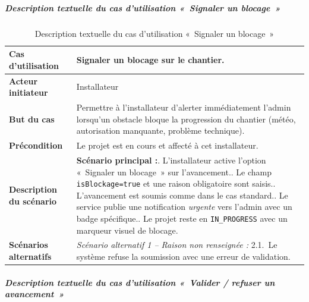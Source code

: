 \subparagraph{Description textuelle du cas d'utilisation «~Signaler un blocage~»}

\begin{table}[H]
  \caption{Description textuelle du cas d'utilisation «~Signaler un blocage~»}
  \label{tab:cu-blocage}
  \centering
  \begin{tabularx}{\textwidth}{|L{3.8cm}|X|}
    \hline
    \textbf{Cas d'utilisation} & Signaler un blocage sur le chantier. \\
    \hline
    \textbf{Acteur initiateur} & Installateur \\
    \hline
    \textbf{But du cas} & Permettre à l'installateur d'alerter immédiatement l'admin lorsqu'un obstacle bloque la progression du chantier (météo, autorisation manquante, problème technique). \\
    \hline
    \textbf{Précondition} & Le projet est en cours et affecté à cet installateur. \\
    \hline
    \textbf{Description du scénario} &
    \textbf{Scénario principal :}. L'installateur active l'option «~Signaler un blocage~» sur l'avancement.. Le champ \texttt{isBlockage=true} et une raison obligatoire sont saisis.. L'avancement est soumis comme dans le cas standard.. Le service publie une notification \textit{urgente} vers l'admin avec un badge spécifique.. Le projet reste en \texttt{IN\_PROGRESS} avec un marqueur visuel de blocage.\\
    \hline
    \textbf{Scénarios alternatifs} &
    \textit{Scénario alternatif 1 -- Raison non renseignée :}\newline
    \hspace*{6pt}2.1.~Le système refuse la soumission avec une erreur de validation.\\
    \hline
  \end{tabularx}
\end{table}

\subparagraph{Description textuelle du cas d'utilisation «~Valider / refuser un avancement~»}

